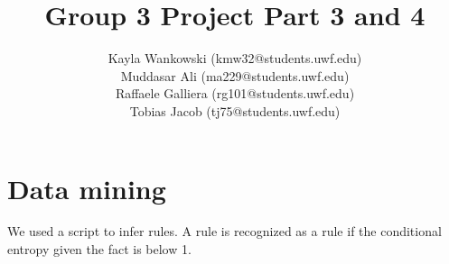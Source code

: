 \documentclass{article}
\begin{document}
\title{Group 3 Project Part 3 and 4}
\author{
    Kayla Wankowski (kmw32@students.uwf.edu)\\
    Muddasar Ali (ma229@students.uwf.edu)\\
    Raffaele Galliera (rg101@students.uwf.edu)\\
    Tobias Jacob (tj75@students.uwf.edu)
}

\maketitle

\section{Data mining}

We used a script to infer rules.
A rule is recognized as a rule if the conditional entropy given the fact is below 1.
\end{document}
